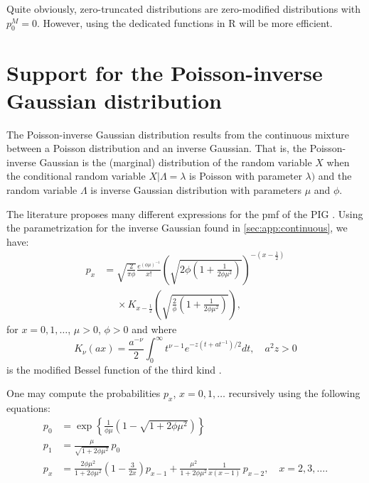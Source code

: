 \documentclass[x11names]{article}
\newcommand{\proglang}[1]{\textsf{#1}}
\begin{document}
Quite obviously, zero-truncated distributions are zero-modified
distributions with $p_0^M = 0$. However, using the dedicated functions
in \proglang{R} will be more efficient.


\section{Support for the Poisson-inverse Gaussian distribution}
\label{sec:pig}

The Poisson-inverse Gaussian distribution results from the continuous
mixture between a Poisson distribution and an inverse Gaussian. That
is, the Poisson-inverse Gaussian is the (marginal) distribution of the
random variable $X$ when the conditional random variable
$X|\Lambda = \lambda$ is Poisson with parameter $\lambda)$ and the
random variable $\Lambda$ is inverse Gaussian distribution with
parameters $\mu$ and $\phi$.

The literature proposes many different expressions for the pmf of the
PIG
\citep{Holla:PIG:1966,Shaban:PIG:1981,Johnson:discrete:2005,LossModels4e}.
Using the parametrization for the inverse Gaussian found in
\autoref{sec:app:continuous}, we have:
\begin{equation}
  \label{eq:pig:px}
  \begin{split}
    p_x &= \sqrt{\frac{2}{\pi \phi}} \frac{e^{(\phi\mu)^{-1}}}{x!}
    \left(
      \sqrt{2\phi \left( 1 + \frac{1}{2\phi\mu^2} \right)}
    \right)^{-(x - \frac{1}{2})} \\
    &\phantom{=} \times K_{x - \frac{1}{2}} \left( \sqrt{\frac{2}{\phi}\left(1
          + \frac{1}{2\phi\mu^2}\right)} \right),
  \end{split}
\end{equation}
for $x = 0, 1, \dots$, $\mu > 0$, $\phi > 0$ and where
\begin{equation*}
  K_\nu(ax) = \frac{a^{-\nu}}{2} \int_0^\infty t^{\nu - 1}
  e^{- z(t + at^{-1})/2} dt, \quad a^2 z > 0
\end{equation*}
is the modified Bessel function of the third kind
\citep{Bateman:1953:2,Abramowitz:1972}.

One may compute the probabilities $p_x$, $x = 0, 1, \dots$ recursively
using the following equations:
\begin{equation}
  \label{eq:pig:px:recursive}
  \begin{split}
    p_0 &= \exp\left\{
      \frac{1}{\phi\mu} \left(1 - \sqrt{1 + 2\phi\mu^2}\right)
    \right\} \\
    p_1 &= \frac{\mu}{\sqrt{1 + 2\phi\mu^2}}\, p_0 \\
    p_x &= \frac{2\phi\mu^2}{1 + 2\phi\mu^2} \left( 1 - \frac{3}{2x}
    \right) p_{x - 1} + \frac{\mu^2}{1 + 2\phi\mu^2} \frac{1}{x(x -
      1)}\, p_{x - 2}, \quad x = 2, 3, \dots.
  \end{split}
\end{equation}
\end{document}
